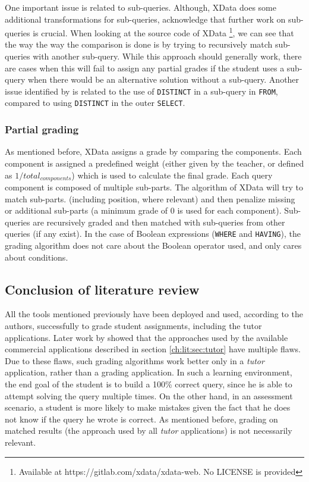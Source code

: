 One important issue is related to sub-queries. Although, XData does some additional transformations for sub-queries, \cite{literature:xdata} acknowledge that further work on sub-queries is crucial. When looking at the source code of XData \footnote{Available at https://gitlab.com/xdata/xdata-web. No LICENSE is provided}, we can see that the way the way the comparison is done is by trying to recursively match sub-queries with another sub-query. While this approach should generally work, there are cases when this will fail to assign any partial grades if the student uses a sub-query when there would be an alternative solution without a sub-query. Another issue identified by \cite{literature:xdata} is related to the use of \texttt{DISTINCT} in a sub-query in \texttt{FROM}, compared to using \texttt{DISTINCT} in the outer \texttt{SELECT}.

\subsubsection{Partial grading}

As mentioned before, XData assigns a grade by comparing the components. Each component is assigned a predefined weight (either given by the teacher, or defined as $1 / total_{components}$) which is used to calculate the final grade. Each query component is composed of multiple sub-parts. The algorithm of XData will try to match sub-parts. (including position, where relevant) and then penalize missing or additional sub-parts (a minimum grade of 0 is used for each component). Sub-queries are recursively graded and then matched with sub-queries from other queries (if any exist). In the case of Boolean expressions (\texttt{WHERE} and \texttt{HAVING}), the grading algorithm does not care about the Boolean operator used, and only cares about conditions.

\subsection{Conclusion of literature review}

All the tools mentioned previously have been deployed and used, according to the authors, successfully to grade student assignments, including the tutor applications. Later work by \cite{literature:xdata} showed that the approaches used by the available commercial applications described in section \ref{ch:lit:sec:tutor} have multiple flaws. Due to these flaws, such grading algorithms work better only in a \textit{tutor} application, rather than a grading application. In such a learning environment, the end goal of the student is to build a 100\% correct query, since he is able to attempt solving the query multiple times. On the other hand, in an assessment scenario, a student is more likely to make mistakes given the fact that he does not know if the query he wrote is correct. As mentioned before, grading on matched results (the approach used by all \textit{tutor} applications) is not necessarily relevant.

